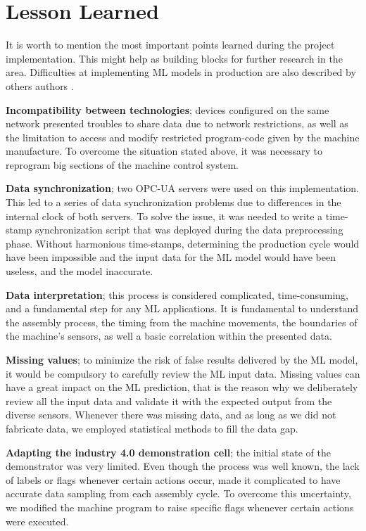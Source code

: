 \documentclass[5p,times,procedia]{elsarticle}
\begin{document}
\section{Lesson Learned} \label{sec:lessons} %

It is worth to mention the most important points learned during the project implementation. This might help as building blocks for further research in the area. Difficulties at implementing ML models in production are also described by others authors \cite{paleyes2020challenges}.
\vspace{0.1cm}

\textbf{Incompatibility between technologies}; devices configured on the same network presented troubles to share data due to network restrictions, as well as the limitation to access and modify restricted program-code given by the machine manufacture. 
To overcome the situation stated above, it was necessary to reprogram big sections of the machine control system.

\textbf{Data synchronization}; two OPC-UA servers were used on this implementation. This led to a series of data synchronization problems due to differences in the internal clock of both servers.
To solve the issue, it was needed to write a time-stamp synchronization script that was deployed during the data preprocessing phase. Without harmonious time-stamps, determining the production cycle would have been impossible and the input data for the ML model would have been useless, and the model inaccurate. 

\textbf{Data interpretation}; this process is considered complicated, time-consuming, and a fundamental step for any ML applications. It is fundamental to understand the assembly process, the timing from the machine movements, the boundaries of the machine's sensors, as well a basic correlation within the presented data.

\textbf{Missing values}; to minimize the risk of false results delivered by the ML model, it would be compulsory to carefully review the ML input data. Missing values can have a great impact on the ML prediction, that is the reason why we deliberately review all the input data and validate it with the expected output from the diverse sensors. Whenever there was missing data, and as long as we did not fabricate data, we employed statistical methods to fill the data gap.

\textbf{Adapting the industry 4.0 demonstration cell}; the initial state of the demonstrator was very limited. Even though the process was well known, the lack of labels or flags whenever certain actions occur, made it complicated to have accurate data sampling from each assembly cycle. To overcome this uncertainty, we modified the machine program to raise specific flags whenever certain actions were executed.
\end{document}
